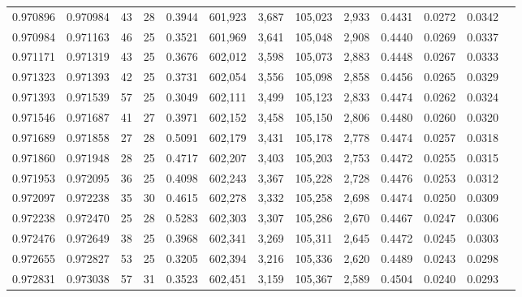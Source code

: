 \begin{tabular}{rrrrrrrrrrrrr}
0.970896 & 0.970984 &    43 &  28 &                                     0.3944 & 601,923 &   3,687 & 105,023 &   2,933 & 0.4431 & 0.0272 & 0.0342 \\
0.970984 & 0.971163 &    46 &  25 &                                     0.3521 & 601,969 &   3,641 & 105,048 &   2,908 & 0.4440 & 0.0269 & 0.0337 \\
0.971171 & 0.971319 &    43 &  25 &                                     0.3676 & 602,012 &   3,598 & 105,073 &   2,883 & 0.4448 & 0.0267 & 0.0333 \\
0.971323 & 0.971393 &    42 &  25 &                                     0.3731 & 602,054 &   3,556 & 105,098 &   2,858 & 0.4456 & 0.0265 & 0.0329 \\
0.971393 & 0.971539 &    57 &  25 &                                     0.3049 & 602,111 &   3,499 & 105,123 &   2,833 & 0.4474 & 0.0262 & 0.0324 \\
0.971546 & 0.971687 &    41 &  27 &                                     0.3971 & 602,152 &   3,458 & 105,150 &   2,806 & 0.4480 & 0.0260 & 0.0320 \\
0.971689 & 0.971858 &    27 &  28 &                                     0.5091 & 602,179 &   3,431 & 105,178 &   2,778 & 0.4474 & 0.0257 & 0.0318 \\
0.971860 & 0.971948 &    28 &  25 &                                     0.4717 & 602,207 &   3,403 & 105,203 &   2,753 & 0.4472 & 0.0255 & 0.0315 \\
0.971953 & 0.972095 &    36 &  25 &                                     0.4098 & 602,243 &   3,367 & 105,228 &   2,728 & 0.4476 & 0.0253 & 0.0312 \\
0.972097 & 0.972238 &    35 &  30 &                                     0.4615 & 602,278 &   3,332 & 105,258 &   2,698 & 0.4474 & 0.0250 & 0.0309 \\
0.972238 & 0.972470 &    25 &  28 &                                     0.5283 & 602,303 &   3,307 & 105,286 &   2,670 & 0.4467 & 0.0247 & 0.0306 \\
0.972476 & 0.972649 &    38 &  25 &                                     0.3968 & 602,341 &   3,269 & 105,311 &   2,645 & 0.4472 & 0.0245 & 0.0303 \\
0.972655 & 0.972827 &    53 &  25 &                                     0.3205 & 602,394 &   3,216 & 105,336 &   2,620 & 0.4489 & 0.0243 & 0.0298 \\
0.972831 & 0.973038 &    57 &  31 &                                     0.3523 & 602,451 &   3,159 & 105,367 &   2,589 & 0.4504 & 0.0240 & 0.0293 \\

\end{tabular}
